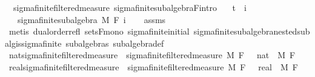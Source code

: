 \begin{isabellebody}
\isanewline
{}\isamarkupfalse%
\ {\isacharparenleft}{\kern0pt}\ sigma{\isacharunderscore}{\kern0pt}finite{\isacharunderscore}{\kern0pt}filtered{\isacharunderscore}{\kern0pt}measure{\isacharparenright}{\kern0pt}\ sigma{\isacharunderscore}{\kern0pt}finite{\isacharunderscore}{\kern0pt}subalgebra{\isacharunderscore}{\kern0pt}F{\isacharbrackleft}{\kern0pt}intro{\isacharbrackright}{\kern0pt}{\isacharcolon}{\kern0pt}\isanewline
\ \ \ {\isachardoublequoteopen}t\ {\isasymle}\ i{\isachardoublequoteclose}\isanewline
\ \ \ {\isachardoublequoteopen}sigma{\isacharunderscore}{\kern0pt}finite{\isacharunderscore}{\kern0pt}subalgebra\ M\ {\isacharparenleft}{\kern0pt}F\ i{\isacharparenright}{\kern0pt}{\isachardoublequoteclose}\isanewline
%
\isadelimproof
\ \ %
\endisadelimproof
%
\isatagproof
{}\isamarkupfalse%
\ assms\ \isamarkupfalse%
\ {\isacharparenleft}{\kern0pt}metis\ dual{\isacharunderscore}{\kern0pt}order{\isachardot}{\kern0pt}refl\ sets{\isacharunderscore}{\kern0pt}F{\isacharunderscore}{\kern0pt}mono\ sigma{\isacharunderscore}{\kern0pt}finite{\isacharunderscore}{\kern0pt}initial\ sigma{\isacharunderscore}{\kern0pt}finite{\isacharunderscore}{\kern0pt}subalgebra{\isachardot}{\kern0pt}nested{\isacharunderscore}{\kern0pt}subalg{\isacharunderscore}{\kern0pt}is{\isacharunderscore}{\kern0pt}sigma{\isacharunderscore}{\kern0pt}finite\ subalgebras\ subalgebra{\isacharunderscore}{\kern0pt}def{\isacharparenright}{\kern0pt}%
\endisatagproof
{\isafoldproof}%
%
\isadelimproof
\isanewline
%
\endisadelimproof
\isanewline
{}\isamarkupfalse%
\ nat{\isacharunderscore}{\kern0pt}sigma{\isacharunderscore}{\kern0pt}finite{\isacharunderscore}{\kern0pt}filtered{\isacharunderscore}{\kern0pt}measure\ {\isacharequal}{\kern0pt}\ sigma{\isacharunderscore}{\kern0pt}finite{\isacharunderscore}{\kern0pt}filtered{\isacharunderscore}{\kern0pt}measure\ M\ F\ {\isachardoublequoteopen}{}\ {\isacharcolon}{\kern0pt}{\isacharcolon}{\kern0pt}\ nat{\isachardoublequoteclose}\ \ M\ F\isanewline
{}\isamarkupfalse%
\ real{\isacharunderscore}{\kern0pt}sigma{\isacharunderscore}{\kern0pt}finite{\isacharunderscore}{\kern0pt}filtered{\isacharunderscore}{\kern0pt}measure\ {\isacharequal}{\kern0pt}\ sigma{\isacharunderscore}{\kern0pt}finite{\isacharunderscore}{\kern0pt}filtered{\isacharunderscore}{\kern0pt}measure\ M\ F\ {\isachardoublequoteopen}{}\ {\isacharcolon}{\kern0pt}{\isacharcolon}{\kern0pt}\ real{\isachardoublequoteclose}\ \ M\ F\isanewline

\end{isabellebody}
